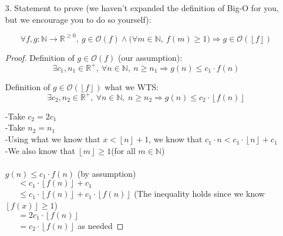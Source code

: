 \documentclass[fontsize=11pt]{article}
\newcommand{\N}{\mathbb{N}}
\newcommand{\R}{\mathbb{R}}
\newcommand{\cO}{\mathcal{O}}
\newcommand{\floor}[1]{\left\lfloor #1 \right\rfloor}
\begin{document}
\begin{enumerate}
\begin{proof}
: \\ -let $c = 1.2$ \\
-Let $n_0 = 1$ \\
-We know $2.4 < \frac{1}{\log_{14} 3} < 2.5$ and $1.1 < \frac{1}{\log_{14} 3} < 1.2$ \\~\\
-Since $n \geq 1$, $\log_{14} n$, $\log_{3} n$, and $\log_{11} n$ will never be negative \\
$log_{3} n - log_{11} n$ \\
$= \frac{\log_{14} n}{\log_{14} 3} - \frac{\log_{14} n}{\log_{14} 11}$ \\
$= \log_{14} n\frac{1}{\log_{14} 3} - \log_{14} n \frac{1}{\log_{14} 11}$ \\
$= \log_{14} n\frac{1}{\log_{14} 3} + (-\log_{14} n \frac{1}{\log_{14} 11})$ \\
$\geq 2.4\log_{14}c+ (-1.2\log_{14} n)$ \\
$= 1.2\log_{14} n$ \\~\\
-Therefore $\log_{3} n - \log_{11} n \geq c \cdot \log_{14} n$ as needed

\end{proof}

\item[3.] Statement to prove (we haven't expanded the definition of Big-O for you, but we encourage you to do so yourself):

$$\forall f, g: \N \to \R^{\geq 0},~ g \in \cO(f) \land \big(\forall m \in \N,~ f(m) \geq 1 \big) \Rightarrow g \in \cO(\floor{f})$$

\begin{proof}
Definition of $g \in \cO(f)$ (our assumption): $$\exists c_1, n_1 \in \R^+,~ \forall n \in \N,~ n \geq n_1 \Rightarrow g(n) \leq c_1 \cdot f(n)$$

Definition of $g \in \cO(\floor{f})$ what we WTS: $$\exists c_2, n_2 \in \R^+,~ \forall n \in \N,~ n \geq n_2 \Rightarrow g(n) \leq c_2 \cdot \floor{f(n)}$$

-Take $c_2 = 2c_1$ \\
-Take $n_2 = n_1$ \\
-Using what we know that $ x < \floor{n} + 1$, we know that $ c_1 \cdot n < c_1 \cdot \floor{n} + c_1$ \\
-We also know that $\floor{m} \geq 1$(for all $m \in \N$) \\~\\
$g(n) \leq c_1 \cdot f(n)$ (by assumption) \\
$~~~~~~~ < c_1 \cdot \floor{f(n)} + c_1$ \\
$~~~~~~~ \leq c_1 \cdot \floor{f(n)} + c_1 \cdot \floor{f(n)}$ (The inequality holds since we know $\floor{f(x)} \geq 1$) \\
$~~~~~~~ = 2c_1 \cdot \floor{f(n)}$ \\
$~~~~~~~ = c_2 \cdot \floor{f(n)}$ as needed

\end{proof}

\end{enumerate}
\end{document}
